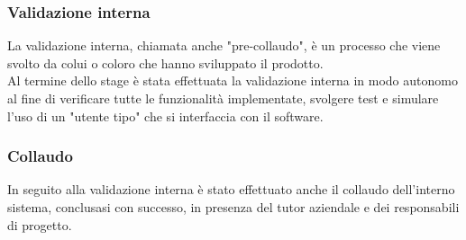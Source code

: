 \subsubsection{Validazione interna}
La validazione interna, chiamata anche "pre-collaudo", è un processo che viene svolto da colui o coloro che hanno sviluppato il prodotto.\\
Al termine dello stage è stata effettuata la validazione interna in modo autonomo al fine di verificare tutte le funzionalità implementate, svolgere test e simulare l'uso di un "utente tipo" che si interfaccia con il software.
\subsubsection{Collaudo}
In seguito alla validazione interna è stato effettuato anche il collaudo dell'interno sistema, conclusasi con successo, in presenza del tutor aziendale e dei responsabili di progetto.

